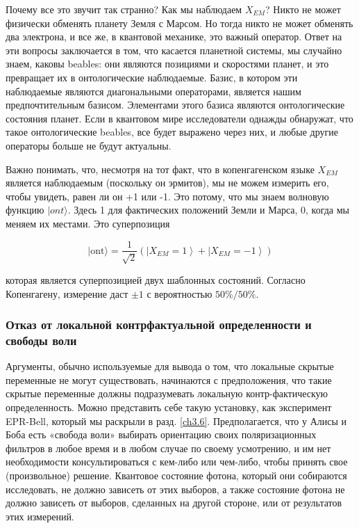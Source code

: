 \documentclass[main.tex]{subfiles}
\begin{document}
Почему все это звучит так странно? Как мы наблюдаем $X_{EM}$? Никто не может физически обменять планету Земля с Марсом. Но тогда никто не может обменять два электрона, и все же, в квантовой механике, это важный оператор. Ответ на эти вопросы заключается в том, что касается планетной системы, мы случайно знаем, каковы beables: они являются позициями и скоростями планет, и это превращает их в онтологические наблюдаемые. Базис, в котором эти наблюдаемые являются диагональными операторами, является нашим предпочтительным базисом. Элементами этого базиса являются онтологические состояния планет. Если в квантовом мире исследователи однажды обнаружат, что такое онтологические beables, все будет выражено через них, и любые другие операторы больше не будут актуальны.

Важно понимать, что, несмотря на тот факт, что в копенгагенском языке $X_{EM}$ является наблюдаемым (поскольку он эрмитов), мы не можем измерить его, чтобы увидеть, равен ли он +1 или -1. Это потому, что мы знаем волновую функцию $| ont\rangle$. Здесь 1 для фактических положений Земли и Марса, 0, когда мы меняем их местами. Это суперпозиция

\begin{equation}\label{5.28}
	| \text {ont}\rangle=\frac{1}{\sqrt{2}}\left(\left|X_{E M}=1\right\rangle+\left|X_{E M}=-1\right\rangle\right)
\end{equation}
            
которая является суперпозицией двух шаблонных состояний. Согласно Копенгагену, измерение даст $\pm 1$ с вероятностью $50\% / 50\%$.

\subsubsection{Отказ от локальной контрфактуальной определенности и свободы воли}\label{ch5.7.2}

Аргументы, обычно используемые для вывода о том, что локальные скрытые переменные не могут существовать, начинаются с предположения, что такие скрытые переменные должны подразумевать локальную контр-фактическую определенность. Можно представить себе такую установку, как эксперимент EPR-Bell, который мы раскрыли в разд. \ref{ch3.6}. Предполагается, что у Алисы и Боба есть «свобода воли» выбирать ориентацию своих поляризационных фильтров в любое время и в любом случае по своему усмотрению, и им нет необходимости консультироваться с кем-либо или чем-либо, чтобы принять свое (произвольное) решение. Квантовое состояние фотона, который они собираются исследовать, не должно зависеть от этих выборов, а также состояние фотона не должно зависеть от выборов, сделанных на другой стороне, или от результатов этих измерений.
\end{document}
